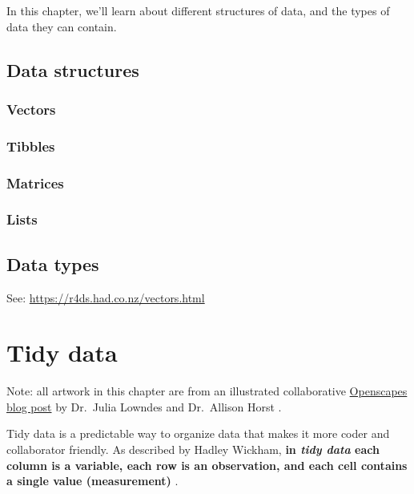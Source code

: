 \documentclass[
]{book}
\begin{document}
In this chapter, we'll learn about different structures of data, and the types of data they can contain.

\hypertarget{data-structures}{%
\section{Data structures}\label{data-structures}}

\hypertarget{vectors}{%
\subsection{Vectors}\label{vectors}}

\hypertarget{tibbles}{%
\subsection{Tibbles}\label{tibbles}}

\hypertarget{matrices}{%
\subsection{Matrices}\label{matrices}}

\hypertarget{lists}{%
\subsection{Lists}\label{lists}}

\hypertarget{data-types}{%
\section{Data types}\label{data-types}}

See: \url{https://r4ds.had.co.nz/vectors.html}

\hypertarget{tidydata}{%
\chapter{Tidy data}\label{tidydata}}

Note: all artwork in this chapter are from an illustrated collaborative \href{https://www.openscapes.org/blog/2020/10/12/tidy-data/}{Openscapes blog post} by Dr.~Julia Lowndes and Dr.~Allison Horst \citep{lowndes_tidy_2020}.

Tidy data is a predictable way to organize data that makes it more coder and collaborator friendly. As described by Hadley Wickham, \textbf{in \emph{tidy data} each column is a variable, each row is an observation, and each cell contains a single value (measurement)} \citep{wickham_tidy_2014}.
\end{document}

